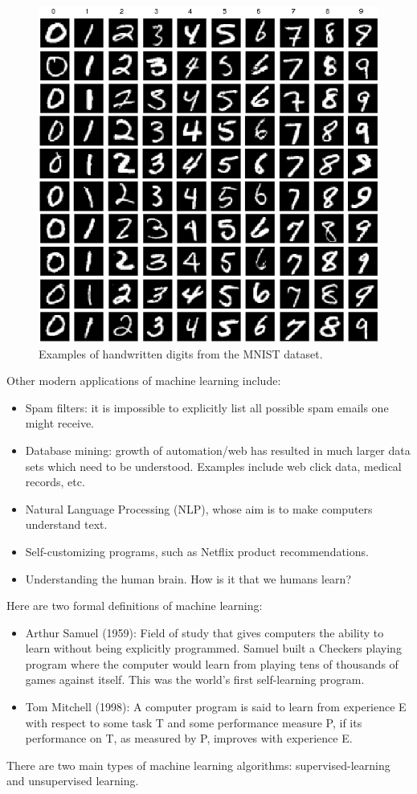 \documentclass{article}
\theoremstyle{definition}
\begin{document}
\begin{figure}[ht]
\centering
\includegraphics[scale=0.4]{images/intro/mnist-ex.png}
\caption{Examples of handwritten digits from the MNIST dataset.}
\label{intro-fig:mnist-examples}
\end{figure}
Other modern applications of machine learning include:
\begin{itemize}
    \item Spam filters: it is impossible to explicitly list all possible spam emails one might receive.
    \item Database mining: growth of automation/web has resulted in much larger data sets which need to be understood. Examples include web click data, medical records, etc.
    \item Natural Language Processing (NLP), whose aim is to make computers understand text.
    \item Self-customizing programs, such as Netflix product recommendations.
    \item Understanding the human brain. How is it that we humans learn?
\end{itemize}
Here are two formal definitions of machine learning:
\begin{itemize}
    \item Arthur Samuel (1959): Field of study that gives computers the ability to learn without being explicitly programmed. Samuel built a Checkers playing program where the computer would learn from playing tens of thousands of games against itself. This was the world's first self-learning program.
    \item Tom Mitchell (1998): A computer program is said to learn from experience E with respect to some task T and some performance measure P, if its performance on T, as measured by P, improves with experience E.
\end{itemize}
There are two main types of machine learning algorithms: supervised-learning and unsupervised learning.
\end{document}
